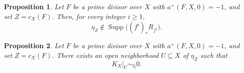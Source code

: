 \documentclass[11pt,a4paper]{article}
\newtheorem{proposition}{Proposition}
\newcommand{\Q}{\mathbb Q}
\DeclareMathOperator{\Supp}{Supp}
\begin{document}
\begin{proposition}\label{prop:avoidance}
Let $F$ be a prime divisor over $X$ with $a^+(F,X,0)=-1$, and set
$Z=c_X(F)$. Then, for every integer $i\ge1$,
\[
 \eta_Z\notin\Supp\bigl((f^i)_*R_{f^i}\bigr).
\]
\end{proposition}

\begin{proposition}\label{prop:local-q-triviality}
Let $F$ be a prime divisor over $X$ with $a^+(F,X,0)=-1$, and set
$Z=c_X(F)$. There exists an open neighborhood $U\subseteq X$ of
$\eta_Z$ such that
\[
 K_X|_U\sim_{\Q}0.
\]
\end{proposition}
\end{document}
